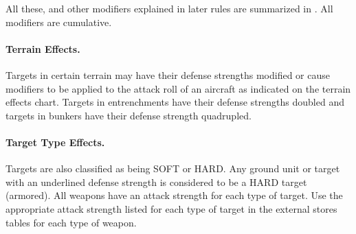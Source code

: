All these, and other modifiers explained in later rules are summarized in . All modifiers are cumulative.

\paragraph{Terrain Effects.} Targets in certain terrain may have their defense strengths modified or cause modifiers to be applied to the attack roll of an aircraft as indicated on the terrain effects chart. Targets in entrenchments have their defense strengths doubled and targets in bunkers have their defense strength quadrupled.

\paragraph{Target Type Effects.} Targets are also classified as being SOFT or HARD. Any ground unit or target with an underlined defense strength is considered to be a HARD target (armored). All weapons have an attack strength for each type of target. Use the appropriate attack strength listed for each type of target in the external stores tables for each type of weapon.


